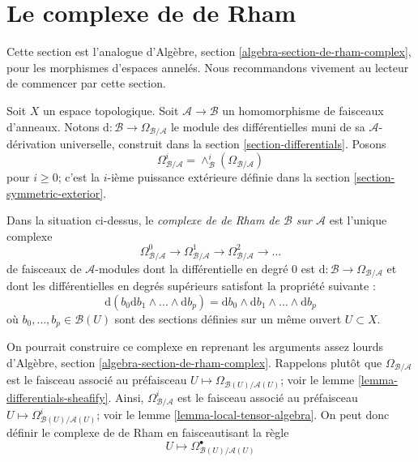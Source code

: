 \section{Le complexe de de Rham}
\label{section-de-rham-complex}

\noindent
Cette section est l'analogue d'Algèbre, section
\ref{algebra-section-de-rham-complex}, pour les morphismes d'espaces annelés.
Nous recommandons vivement au lecteur de commencer par cette section.

\medskip\noindent
Soit $X$ un espace topologique. Soit $\mathcal{A} \to \mathcal{B}$ un
homomorphisme de faisceaux d'anneaux. Notons
$\text{d} : \mathcal{B} \to \Omega_{\mathcal{B}/\mathcal{A}}$
le module des différentielles muni de sa $\mathcal{A}$-dérivation universelle,
construit dans la section \ref{section-differentials}. Posons
$$
\Omega_{\mathcal{B}/\mathcal{A}}^i =
\wedge^i_\mathcal{B}(\Omega_{\mathcal{B}/\mathcal{A}})
$$
pour $i \geq 0$; c'est la $i$-ième puissance extérieure définie dans la
section \ref{section-symmetric-exterior}.

\begin{definition}
\label{definition-de-rham-complex}
Dans la situation ci-dessus, le
{\it complexe de de Rham de $\mathcal{B}$ sur $\mathcal{A}$} est l'unique
complexe
$$
\Omega_{\mathcal{B}/\mathcal{A}}^0 \to
\Omega_{\mathcal{B}/\mathcal{A}}^1 \to
\Omega_{\mathcal{B}/\mathcal{A}}^2 \to \ldots
$$
de faisceaux de $\mathcal{A}$-modules dont la différentielle en degré $0$
est $\text{d} : \mathcal{B} \to \Omega_{\mathcal{B}/\mathcal{A}}$ et dont
les différentielles en degrés supérieurs satisfont la propriété suivante :
\begin{equation}
\label{equation-rule}
\text{d}\left(b_0\text{d}b_1 \wedge \ldots \wedge \text{d}b_p\right) =
\text{d}b_0 \wedge \text{d}b_1 \wedge \ldots \wedge \text{d}b_p
\end{equation}
où $b_0, \ldots, b_p \in \mathcal{B}(U)$ sont des sections définies sur un même
ouvert $U \subset X$.
\end{definition}

\noindent
On pourrait construire ce complexe en reprenant les arguments assez lourds
d'Algèbre, section \ref{algebra-section-de-rham-complex}. Rappelons plutôt
que $\Omega_{\mathcal{B}/\mathcal{A}}$ est le faisceau associé au préfaisceau
$U \mapsto \Omega_{\mathcal{B}(U)/\mathcal{A}(U)}$; voir le lemme
\ref{lemma-differentials-sheafify}. Ainsi,
$\Omega_{\mathcal{B}/\mathcal{A}}^i$ est le faisceau associé au préfaisceau
$U \mapsto \Omega^i_{\mathcal{B}(U)/\mathcal{A}(U)}$; voir le lemme
\ref{lemma-local-tensor-algebra}. On peut donc définir le complexe de de Rham
en faisceautisant la règle
$$
U \longmapsto
\Omega^\bullet_{\mathcal{B}(U)/\mathcal{A}(U)}
$$

